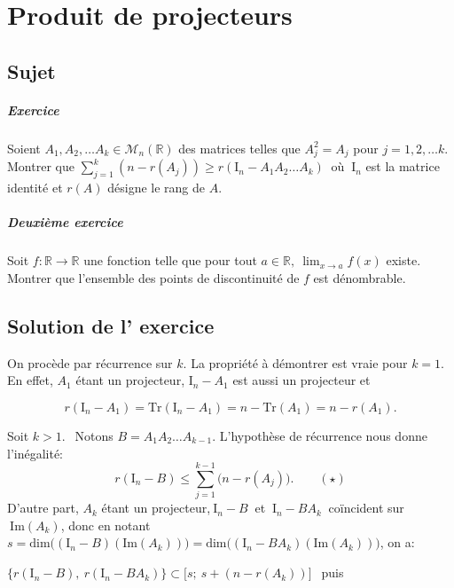 \chapter{Produit de projecteurs}

\section{Sujet}
\paragraph { Exercice}

Soient $A_1,A_2,\dots A_k \in \mathcal M_n (\mathbb R)$ des matrices telles que $A_j^2 =A_j$ pour $j=1,2,\dots k.$ Montrer que
$\displaystyle \sum_{j=1} ^k (n- r(A_j)) \geqslant r (\mathrm I_n -A_1A_2\dots A_k)\:$ où $\:\mathrm I_n$ est la matrice identité et $r(A)$ désigne le rang de $A.$
\paragraph{Deuxième exercice}

Soit $f : \mathbb R \to \mathbb R$ une fonction telle que pour tout $a \in \mathbb R,\ \lim_{x\to a} f(x)$ existe.
Montrer que l'ensemble des points de discontinuité de $f$ est dénombrable.

\section{Solution de l' exercice} %

On procède par récurrence sur $k.$
La propriété à démontrer est vraie pour $k=1$.
En effet, $A_1$ étant un projecteur, $\mathrm I_n -A_1$ est aussi un projecteur et 

$$r(\mathrm I _n -A_1) = \mathrm{Tr} (\mathrm I_n -A_1) = n -\mathrm{Tr} (A_1) =n -r(A_1).$$

Soit $k>1.\:\:$ Notons $B=A_1A_2 \dots A_{k-1}.$ L'hypothèse de récurrence nous donne l'inégalité:
$$r( \mathrm I_n - B) \leqslant\displaystyle \sum _{j=1}^{k-1} \big(n- r(A_j)\big) . \qquad (\star)$$ 
D'autre part, $A_k$ étant un projecteur,$\:\mathrm I_n -B\:$ et $\:\mathrm I_n- BA_k\:$ coïncident sur $\:\text {Im}(A_k)$, donc en notant $s= \text{dim}\Big( (\mathrm I_n -B) (\text{Im}(A_k))\Big) = \text{dim} \Big (( \mathrm I_n - BA_k) (\text {Im} (A_k)) \Big)$, on a:

$ \Big\{  r(\mathrm I_n -B),\: r(\mathrm I_n - BA_k) \Big \} \subset \Big[s;\: s + (n-r(A_k))\Big] \:\:$ puis


